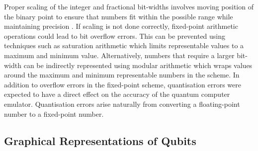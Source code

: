 Proper scaling of the integer and fractional bit-widths involves moving position of the binary point to ensure that numbers fit within the possible range while maintaining precision \cite{harvie2024how}. If scaling is not done correctly, fixed-point arithmetic operations could lead to bit overflow errors. This can be prevented using techniques such as saturation arithmetic which limits representable values to a maximum and minimum value. Alternatively, numbers that require a larger bit-width can be indirectly represented using modular arithmetic which wraps values around the maximum and minimum representable numbers in the scheme. In addition to overflow errors in the fixed-point scheme, quantisation errors were expected to have a direct effect on the accuracy of the quantum computer emulator. Quantisation errors arise naturally from converting a floating-point number to a fixed-point number.

\subsection{Graphical Representations of Qubits}


